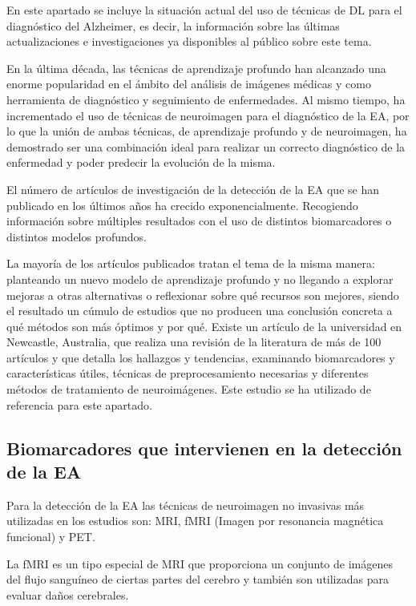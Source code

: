 
En este apartado se incluye la situación actual del uso de técnicas de DL para el diagnóstico del Alzheimer, es decir,
la información sobre las últimas actualizaciones e investigaciones ya disponibles al público sobre este tema.

En la última década, las técnicas de aprendizaje profundo han alcanzado una enorme popularidad en el ámbito del análisis
de imágenes médicas y como herramienta de diagnóstico y seguimiento de enfermedades.
Al mismo tiempo, ha incrementado el uso de técnicas de neuroimagen para el diagnóstico de la EA, por lo que la unión de
ambas técnicas, de aprendizaje profundo y de neuroimagen, ha demostrado ser una combinación ideal para realizar un
correcto diagnóstico de la enfermedad y poder predecir la evolución de la misma.

El número de artículos de investigación de la detección de la EA que se han publicado en los últimos años ha crecido
exponencialmente.
Recogiendo información sobre múltiples resultados con el uso de distintos biomarcadores o distintos modelos profundos.

La mayoría de los artículos publicados tratan el tema de la misma manera: planteando un nuevo modelo de aprendizaje
profundo y no llegando a explorar mejoras a otras alternativas o reflexionar sobre qué recursos son mejores, siendo el
resultado un cúmulo de estudios que no producen una conclusión concreta a qué métodos son más óptimos y por qué.
Existe un artículo de la universidad en Newcastle, Australia, que realiza una revisión de la literatura de más de 100
artículos y que detalla los hallazgos y tendencias, examinando biomarcadores y características útiles, técnicas de
preprocesamiento necesarias y diferentes métodos de tratamiento de neuroimágenes.
Este estudio se ha utilizado de referencia para este apartado.

\subsection{Biomarcadores que intervienen en la detección de la EA}\label{subsec:biomarcadores-estado-del-arte}
Para la detección de la EA las técnicas de neuroimagen no invasivas más utilizadas en los estudios son: MRI, fMRI
(Imagen por resonancia magnética funcional)  y PET.

La fMRI es un tipo especial de MRI que proporciona un conjunto de imágenes del flujo sanguíneo de ciertas partes del
cerebro y también son utilizadas para evaluar daños cerebrales.

